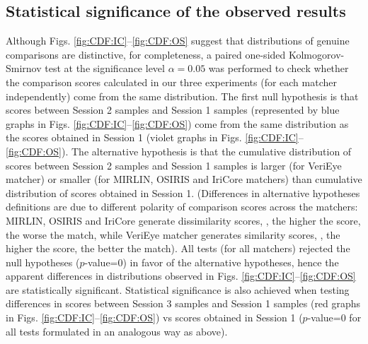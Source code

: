 \documentclass[10pt,twocolumn,letterpaper]{article}
\begin{document}
\subsection{Statistical significance of the observed results}

Although Figs. \ref{fig:CDF:IC}--\ref{fig:CDF:OS} suggest that distributions of genuine comparisons are distinctive, for completeness, a paired one-sided Kolmogorov-Smirnov test at the significance level $\alpha=0.05$ was performed to check whether the comparison scores calculated in our three experiments (for each matcher independently) come from the same distribution. The first null hypothesis is that scores between Session 2 samples and Session 1 samples (represented by blue graphs in Figs. \ref{fig:CDF:IC}--\ref{fig:CDF:OS}) come from the same distribution as the scores obtained in Session 1 (violet graphs in Figs. \ref{fig:CDF:IC}--\ref{fig:CDF:OS}). The alternative hypothesis is that the cumulative distribution of scores between Session 2 samples and Session 1 samples is larger (for VeriEye matcher) or smaller (for MIRLIN, OSIRIS and IriCore matchers) than cumulative distribution of scores obtained in Session 1. (Differences in alternative hypotheses definitions are due to different polarity of comparison scores across the matchers: MIRLIN, OSIRIS and IriCore generate dissimilarity scores, \ie, the higher the score, the worse the match, while VeriEye matcher generates similarity scores, \ie, the higher the score, the better the match). All tests (for all matchers) rejected the null hypotheses ($p$-value=0) in favor of the alternative hypotheses, hence the apparent differences in distributions observed in Figs. \ref{fig:CDF:IC}--\ref{fig:CDF:OS} are statistically significant. Statistical significance is also achieved when testing differences in scores between Session 3 samples and Session 1 samples (red graphs in Figs. \ref{fig:CDF:IC}--\ref{fig:CDF:OS}) vs scores obtained in Session 1 ($p$-value=0 for all tests formulated in an analogous way as above). 




\end{document}
